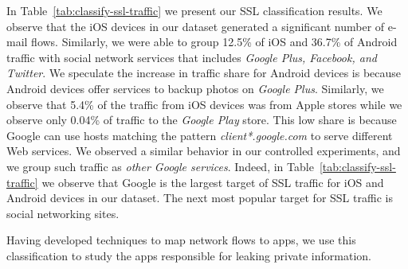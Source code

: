 In Table~\ref{tab:classify-ssl-traffic} we present our SSL classification results.
We observe that the iOS devices in our dataset generated a significant number of e-mail flows.
Similarly, we were able to group 12.5\% of iOS and 36.7\% of Android traffic with social network services that includes \emph{Google Plus, Facebook, and Twitter}.
We speculate the increase in traffic share for Android devices is because Android devices offer services to backup photos on \emph{Google Plus}.
Similarly, we observe that 5.4\% of the traffic from iOS devices was from Apple stores while we observe only 0.04\% of traffic to the \emph{Google Play} store. 
This low share is because Google can use hosts matching the pattern \emph{client*.google.com} to serve different Web services.
We observed a similar behavior in our controlled experiments, and we group such traffic as \emph{other Google services}.
Indeed, in Table~\ref{tab:classify-ssl-traffic} we observe that Google is the largest target of SSL traffic for iOS and Android devices in our dataset. 
The next most popular target for SSL traffic is social networking sites.

Having developed techniques to map network flows to apps, we use this classification to study the apps responsible for 
leaking private information.



